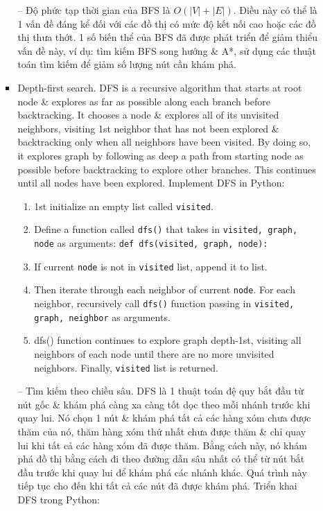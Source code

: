 \documentclass{article}
\begin{document}
\begin{itemize}
\begin{itemize}
\begin{itemize}
            -- Độ phức tạp thời gian của BFS là $O(|V| + |E|)$. Điều này có thể là 1 vấn đề đáng kể đối với các đồ thị có mức độ kết nối cao hoặc các đồ thị thưa thớt. 1 số biến thể của BFS đã được phát triển để giảm thiểu vấn đề này, ví dụ: tìm kiếm BFS song hướng \& A*, sử dụng các thuật toán tìm kiếm để giảm số lượng nút cần khám phá.
            \item {\sf Depth-first search.} DFS is a recursive algorithm that starts at root node \& explores as far as possible along each branch before backtracking. It chooses a node \& explores all of its unvisited neighbors, visiting 1st neighbor that has not been explored \& backtracking only when all neighbors have been visited. By doing so, it explores graph by following as deep a path from starting node as possible before backtracking to explore other branches. This continues until all nodes have been explored. Implement DFS in Python:
            \begin{enumerate}
                \item 1st initialize an empty list called {\tt visited}.
                \item Define a function called {\tt dfs()} that takes in {\tt visited, graph, node} as arguments: {\tt def dfs(visited, graph, node):}
                \item If current {\tt node} is not in {\tt visited} list, append it to list.
                \item Then iterate through each neighbor of current {\tt node}. For each neighbor, recursively call {\tt dfs()} function passing in {\tt visited, graph, neighbor} as arguments.
                \item {\sf dfs()} function continues to explore graph depth-1st, visiting all neighbors of each node until there are no more unvisited neighbors. Finally, {\tt visited} list is returned.
            \end{enumerate}
            -- {\sf Tìm kiếm theo chiều sâu.} DFS là 1 thuật toán đệ quy bắt đầu từ nút gốc \& khám phá càng xa càng tốt dọc theo mỗi nhánh trước khi quay lui. Nó chọn 1 nút \& khám phá tất cả các hàng xóm chưa được thăm của nó, thăm hàng xóm thứ nhất chưa được thăm \& chỉ quay lui khi tất cả các hàng xóm đã được thăm. Bằng cách này, nó khám phá đồ thị bằng cách đi theo đường dẫn sâu nhất có thể từ nút bắt đầu trước khi quay lui để khám phá các nhánh khác. Quá trình này tiếp tục cho đến khi tất cả các nút đã được khám phá. Triển khai DFS trong Python:
            \begin{enumerate}

\end{enumerate}
\end{itemize}
\end{itemize}
\end{itemize}
\end{document}

